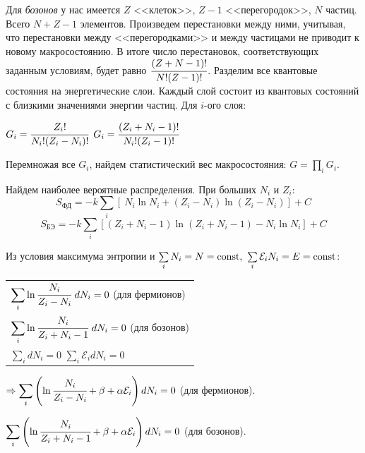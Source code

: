 \documentclass[a4paper, 12pt, openany]{book}
\begin{document}
	\tab Для \textit{бозонов} у нас имеется $Z$ <<клеток>>, $Z - 1$ <<перегородок>>, $N$ частиц. Всего $N + Z - 1$ элементов. Произведем перестановки между ними, учитывая, что перестановки между <<перегородками>> и между частицами не приводит к новому макросостоянию. В итоге число перестановок, соответствующих заданным условиям, будет равно $\cfrac{(Z + N - 1)!}{N! (Z - 1)!}$.
	Разделим все квантовые состояния на энергетические слои. Каждый слой состоит из квантовых состояний с близкими значениями энергии частиц. Для $i$-ого слоя:
	\begin{center}
		$G_i = \cfrac{Z_i!}{N_i! (Z_i - N_i)!}$ \tab\tab $G_i = \cfrac{(Z_i + N_i - 1)!}{N_i! (Z_i - 1)!}$
	\end{center}
	
	\tab Перемножая все $G_i$, найдем статистический вес макросостояния: $G = \prod\limits_i G_i$.
	
	\tab Найдем наиболее вероятные распределения. При больших $N_i$ и $Z_i$:
	$$
	S_{\text{ФД}} = -k \sum\limits_i\left[\ N_i \ln N_i + (Z_i - N_i) \ln (Z_i - N_i) \right] + C
	$$
	$$
	S_{\text{БЭ}} = -k \sum\limits_i \left[ (Z_i + N_i - 1) \ln (Z_i + N_i - 1) - N_i \ln N_i \right] + C
	$$
	
	\tab Из условия максимума энтропии и $\sum\limits_i N_i = N = \operatorname{\mathop{const}},~ \sum\limits_i \mathcal{E}_i N_i = E = \operatorname{\mathop{const}}$:
	\begin{center}
		\begin{tabular}{l}
	$\mathlarger{\sum}\limits_i \ln \cfrac{N_i}{Z_i - N_i} ~ dN_i = 0$ \tab\tab (для фермионов) \\
	$\mathlarger{\sum}\limits_i \ln \cfrac{N_i}{Z_i + N_i - 1} ~ dN_i = 0$ \tab\tab (для бозонов) \vspace{0.2cm} \\
	$\sum\limits_i dN_i = 0$ \tab \tab $\sum\limits_i \mathcal{E}_i dN_i = 0$
		\end{tabular}
	\end{center}
	
	\tab $\Rightarrow \mathlarger\sum\limits_i \left( \ln \cfrac{N_i}{Z_i - N_i} + \beta + \alpha \mathcal{E}_i \right) dN_i = 0$ \tab (для фермионов).
	
	\tab \hphantom{$\Rightarrow$} $\mathlarger\sum\limits_i \left( \ln \cfrac{N_i}{Z_i + N_i - 1} + \beta + \alpha \mathcal{E}_i \right) dN_i = 0$ \tab (для бозонов).
	
\end{document}
